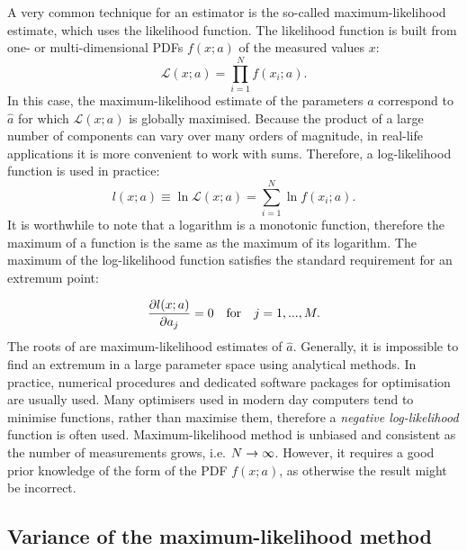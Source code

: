 A very common technique for an estimator is the so-called maximum-likelihood estimate, which uses the likelihood function.
The likelihood function is built from one- or multi-dimensional PDFs $f(x;a)$ of the measured values $x$:
\begin{equation}\label{eq:likelihood_equation}
    \mathcal{L}(x;a) = \prod_{i=1}^N f(x_i; a).
\end{equation}
In this case, the maximum-likelihood estimate of the parameters $a$ correspond to $\hat{a}$ for which $\mathcal{L}(x;a)$ is globally maximised.
Because the product of a large number of components can vary over many orders of magnitude, in real-life applications it is more convenient to work with sums.
Therefore, a log-likelihood function is used in practice:
\begin{equation}
    l(x;a) \equiv \ln\mathcal{L}(x;a) = \sum_{i=1}^N \ln f(x_i;a).
\end{equation}
It is worthwhile to note that a logarithm is a monotonic function, therefore the maximum of a function is the same as the maximum of its logarithm. 
The maximum of the log-likelihood function satisfies the standard requirement for an extremum point:

\begin{equation}\label{eq:likelihood_derivative}
    \pdv{l(x;a)}{a_j}=0 \quad \mathrm{for} \quad j=1,...,M.
\end{equation}
The roots of  are maximum-likelihood estimates of $\hat{a}$. Generally, it is impossible to find an extremum in a large parameter space using analytical methods.
In practice, numerical procedures and dedicated software packages for optimisation are usually used.
Many optimisers used in modern day computers tend to minimise functions, rather than maximise them, therefore a \textit{negative log-likelihood} function is often used.
Maximum-likelihood method is unbiased and consistent as the number of measurements grows, i.e. $N\rightarrow\infty$.
However, it requires a good prior knowledge of the form of the PDF $f(x;a)$, as otherwise the result might be incorrect.

\subsection{Variance of the maximum-likelihood method}\label{sec:mle_variance}


